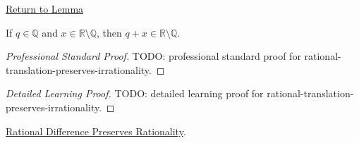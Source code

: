 \newpage
{}
\label{prf:rational-translation-preserves-irrationality}

\begin{remark*}[Return]
\hyperref[lem:rational-translation-preserves-irrationality]{Return to Lemma}
\end{remark*}

\begin{lemma*}
If $q\in\mathbb{Q}$ and $x\in\mathbb{R}\setminus\mathbb{Q}$, then
$q+x\in\mathbb{R}\setminus\mathbb{Q}$.
\end{lemma*}

\begin{proof}[Professional Standard Proof]
\LRAProofBodyStart
TODO: professional standard proof for rational-translation-preserves-irrationality.
\end{proof}

\begin{proof}[Detailed Learning Proof]
\LRAProofBodyStart
TODO: detailed learning proof for rational-translation-preserves-irrationality.
\end{proof}

\begin{remark*}
\end{remark*}

\begin{dependencies}
\hyperref[lem:rational-difference-preserves-rationality]{Rational Difference Preserves Rationality}.
\end{dependencies}

\clearpage
